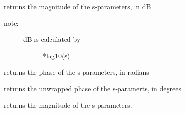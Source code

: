 \documentclass[letterpaper,10pt,english]{sphinxmanual}
\begin{document}
\begin{fulllineitems}
\begin{fulllineitems}
\label{api/mwavepy:mwavepy.network.Network.s22}
\end{fulllineitems}


\begin{fulllineitems}
\label{api/mwavepy:mwavepy.network.Network.s_db}
returns the magnitude of the s-parameters, in dB
\begin{description}
\item[{note:}] \leavevmode\begin{description}
\item[{dB is calculated by }] *log10({\color{red}\bfseries{}\textbar{}s\textbar{}})

\end{description}

\end{description}

\end{fulllineitems}


\begin{fulllineitems}
\label{api/mwavepy:mwavepy.network.Network.s_deg}
returns the phase of the s-parameters, in radians

\end{fulllineitems}


\begin{fulllineitems}
\label{api/mwavepy:mwavepy.network.Network.s_deg_unwrap}
returns the unwrapped phase of the s-paramerts, in degrees

\end{fulllineitems}


\begin{fulllineitems}
\label{api/mwavepy:mwavepy.network.Network.s_mag}
returns the magnitude of the s-parameters.

\end{fulllineitems}



\end{fulllineitems}
\end{document}
